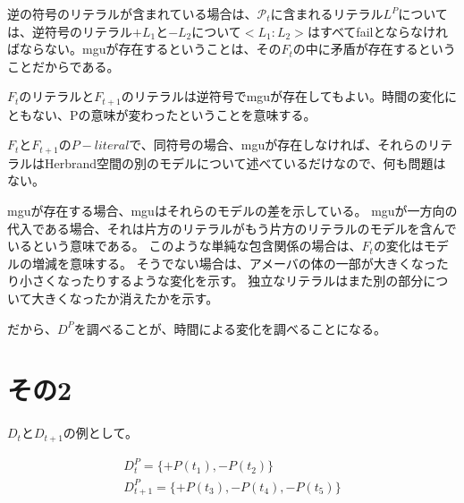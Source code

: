 \documentclass[10pt, onecolumn]{jarticle}   	%
\begin{document}
逆の符号のリテラルが含まれている場合は、$\mathcal{P}_t$に含まれるリテラル$L^P$については、逆符号のリテラル$+L_1$と$-L_2$について$<L_1:L_2>$はすべてfailとならなければならない。mguが存在するということは、その$F_t$の中に矛盾が存在するということだからである。

$F_t$のリテラルと$F_{t+1}$のリテラルは逆符号でmguが存在してもよい。時間の変化にともない、Pの意味が変わったということを意味する。


$F_t$と$F_{t+1}$の$P-literal$で、同符号の場合、mguが存在しなければ、それらのリテラルはHerbrand空間の別のモデルについて述べているだけなので、何も問題はない。

mguが存在する場合、mguはそれらのモデルの差を示している。
mguが一方向の代入である場合、それは片方のリテラルがもう片方のリテラルのモデルを含んでいるという意味である。
このような単純な包含関係の場合は、$F_t$の変化はモデルの増減を意味する。
そうでない場合は、アメーバの体の一部が大きくなったり小さくなったりするような変化を示す。
独立なリテラルはまた別の部分について大きくなったか消えたかを示す。

だから、$D^P$を調べることが、時間による変化を調べることになる。


\section{その2}
$D_t$と$D_{t+1}$の例として。

\begin{eqnarray*}
D^P_t = \{+P(t_1), -P(t_2)\}\\
D^P_{t+1} = \{+P(t_3), -P(t_4), -P(t_5)\}
\end{eqnarray*}
\end{document}

